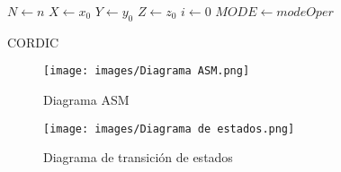 \documentclass[12pt, a4paper]{article}
\begin{document}
\begin{algorithm}[h]
\SetAlgoLined
 $N\gets n$\;
 $X\gets x_0$\;
 $Y\gets y_0$\;
 $Z\gets z_0$\;
 $i\gets 0$\;
 $MODE\gets modeOper$\;
 \caption{CORDIC}
\end{algorithm}

\clearpage

\begin{figure}[h]
      \centering
      \texttt{[image: images/Diagrama ASM.png]}
      \caption {Diagrama ASM}
      \label{fig:DASM}
\end{figure}

\hfill
\break

\begin{figure}[h]
      \centering
      \texttt{[image: images/Diagrama de estados.png]}
      \caption {Diagrama de transición de estados}
      \label{fig:Dest}
\end{figure}
\end{document}
